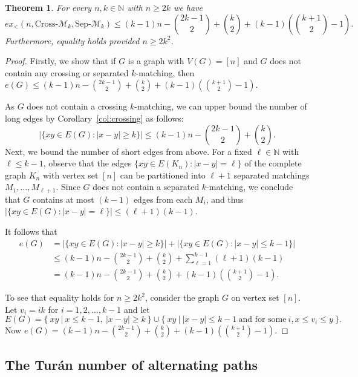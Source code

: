 \documentclass[11pt]{article}
\newtheorem{theorem}{Theorem}[section]
\theoremstyle{definition}
\def\marrow{{\marginpar[\hfill$\longrightarrow$]{$\longleftarrow$}}}
\def\geza#1{{\sc G\'eza says: }{\marrow\sf #1}}
\begin{document}
\begin{theorem}\label{thm:cross,sep}
    For every $n,k\in\mathbb N$ with $n\ge2k$ we have $$ex_<(n,\text{Cross-}\mathcal M_k,\text{Sep-}\mathcal M_k)\le(k-1)n-\binom{2k-1}{2}+\binom{k}{2}+(k-1)\left(\binom{k+1}{2}-1\right).$$    
    Furthermore, equality holds provided $n\ge 2k^2$.
\end{theorem}



\begin{proof}
    Firstly, we show that if $G$ is a graph with $V(G)=[n]$ and $G$ does not contain any crossing or separated $k$-matching, then $e(G)\le(k-1)n-\binom{2k-1}{2}+\binom{k}{2}+(k-1)(\binom{k+1}{2}-1)$.
  
    As $G$ does not contain a crossing $k$-matching, we can upper bound the number of long edges by Corollary~\ref{col:crossing} as follows:
    $$|\{xy\in E(G):|x-y|\ge k\}|\le(k-1)n-\binom{2k-1}{2}+\binom{k}{2}.$$
    Next, we bound the number of short edges from above.
    For a fixed $\ell\in\mathbb N$ with $\ell\le k-1$, observe that the edges $\{xy\in E(K_n):|x-y|=\ell\}$ of the complete graph $K_n$ with vertex set $[n]$ can be partitioned into $\ell+1$ separated matchings $M_1,\dots,M_{\ell+1}$.
    Since $G$ does not contain a separated $k$-matching, we conclude that $G$ contains at most $(k-1)$ edges from each $M_i$, and thus $|\{xy\in E(G):|x-y|=\ell\}|\le(\ell+1)(k-1)$.
    
    It follows that
    \begin{align*}
    e(G) & =|\{xy\in E(G):|x-y|\ge k\}|+|\{xy\in E(G):|x-y|\le k-1\}|\\
    & \le(k-1)n-\binom{2k-1}{2}+\binom{k}{2}+\sum_{\ell=1}^{k-1} (\ell+1)(k-1)\\
    & =(k-1)n-\binom{2k-1}{2}+\binom{k}{2}+(k-1)(\binom{k+1}{2}-1).
    \end{align*}

To see that equality holds for $n\ge 2k^2$, consider the graph $G$ on vertex set  $[n]$. Let $v_i=ik$ for $i=1, 2, \ldots, k-1$ and let 
$$E(G)=\{\  xy\ |\  x\le k-1, \ |x-y|\ge k\ \}
\cup\{\ xy\ |\ |x-y|\le k-1 \ {\mbox{and for some}}\ i, x\le v_i\le y\ \}.$$
Now
$e(G)=(k-1)n-\binom{2k-1}{2}+\binom{k}{2}+(k-1)(\binom{k+1}{2}-1)$.    
\end{proof}



\subsection{The Tur\'an number of alternating paths}
\end{document}
